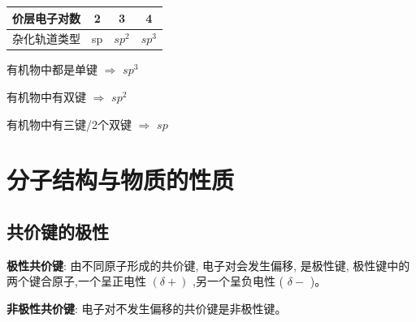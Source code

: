 \documentclass[10pt,cn]{elegantbook}
\begin{document}
\begin{longtable}{|c|c|c|c|} 
	\hline %
	
	价层电子对数 & 2 & 3 & 4 \\ %
	\hline %
	\endfirsthead %
	
	\hline
	\endfoot %
	
	\hline
	\endlastfoot %
	
	杂化轨道类型& sp & $sp^{2}$& $sp^{3}$ \\ %
	\hline %

\end{longtable} %

有机物中都是单键 $\Rightarrow$ $sp^{3}$

有机物中有双键 $\Rightarrow$ $sp^{2}$

有机物中有三键/2个双键 $\Rightarrow$ $sp$


\chapter{分子结构与物质的性质}

\section{共价键的极性}

\textbf{极性共价键}: 由不同原子形成的共价键, 电子对会发生偏移, 是极性键, 极性键中的两个键合原子,一个呈正电性 \(\left( {\delta + }\right)\) ,另一个呈负电性 ( \(\delta -\) )。

\textbf{非极性共价键}: 电子对不发生偏移的共价键是非极性键。

\begin{center}
\end{center}
\end{document}
